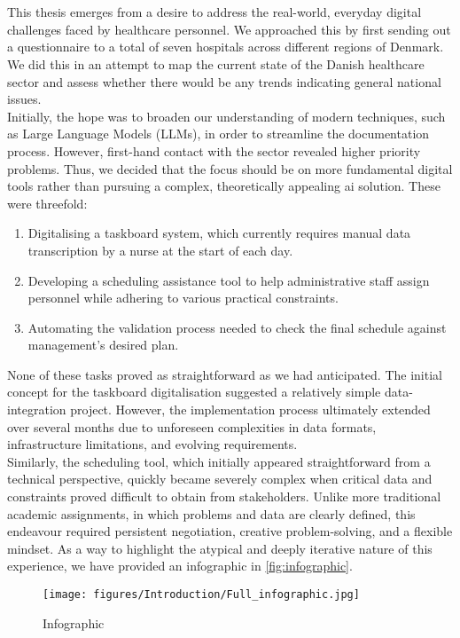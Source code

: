 \\
\\
This thesis emerges from a desire to address the real-world, everyday digital challenges faced by healthcare personnel. We approached this by first sending out a questionnaire to a total of seven hospitals across different regions of Denmark. We did this in an attempt to map the current state of the Danish healthcare sector and assess whether there would be any trends indicating general national issues.
\\
Initially, the hope was to broaden our understanding of modern techniques, such as Large Language Models (LLMs), in order to streamline the documentation process. However, first-hand contact with the sector revealed higher priority problems. Thus, we decided that the focus should be on more fundamental digital tools rather than pursuing a complex, theoretically appealing \acrshort{ai} solution. These were threefold:
\begin{enumerate}
    \item Digitalising a taskboard system, which currently requires manual data transcription by a nurse at the start of each day.
    \item Developing a scheduling assistance tool to help administrative staff assign personnel while adhering to various practical constraints.
    \item Automating the validation process needed to check the final schedule against management's desired plan.
\end{enumerate}
None of these tasks proved as straightforward as we had anticipated. The initial concept for the taskboard digitalisation suggested a relatively simple data-integration project. However, the implementation process ultimately extended over several months due to unforeseen complexities in data formats, infrastructure limitations, and evolving requirements.
\\
Similarly, the scheduling tool, which initially appeared straightforward from a technical perspective, quickly became severely complex when critical data and constraints proved difficult to obtain from stakeholders. Unlike more traditional academic assignments, in which problems and data are clearly defined, this endeavour required persistent negotiation, creative problem-solving, and a flexible mindset. As a way to highlight the atypical and deeply iterative nature of this experience, we have provided an infographic in \autoref{fig:infographic}.

\begin{figure}[H]
    \centering
    \texttt{[image: figures/Introduction/Full\_infographic.jpg]}
    \caption{Infographic}
    \label{fig:infographic}
\end{figure}


